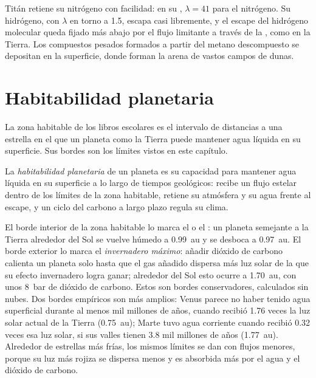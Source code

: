 Titán retiene su nitrógeno con facilidad: en su , $\lambda = 41$ para
el nitrógeno. Su hidrógeno, con $\lambda$ en torno a 1.5, escapa casi libremente, y
el escape del hidrógeno molecular queda fijado más abajo por el flujo limitante
a través de la , como en la Tierra. Los compuestos pesados formados a partir del
metano descompuesto se depositan en la superficie, donde forman la arena de vastos
campos de dunas.

\section{Habitabilidad planetaria}\label{sec:b3:planetary-atmospheres:habitability}

La zona habitable de los libros escolares es el intervalo de distancias a una
estrella en el que un planeta como la Tierra puede mantener agua líquida en su
superficie. Sus bordes son los límites vistos en este capítulo.

\begin{definition}\label{def:b3:planetary-atmospheres:habitability}
La \emph{habitabilidad planetaria} de un
planeta es su capacidad para mantener agua líquida en su superficie a lo largo de
tiempos geológicos: recibe un flujo estelar dentro de los límites de la
zona habitable, retiene su atmósfera y su agua frente al escape, y un
ciclo del carbono a largo plazo regula su clima.
\end{definition}

El borde interior de la zona habitable lo marca el  o el
: un planeta semejante a la Tierra alrededor del Sol se vuelve húmedo a
\qty{0.99}{au} y se desboca a \qty{0.97}{au}. El borde exterior lo marca el
\emph{invernadero máximo}: añadir dióxido de carbono calienta un planeta solo hasta que
el gas añadido dispersa más luz solar de la que su efecto invernadero
logra ganar; alrededor del Sol esto ocurre a
\qty{1.70}{au}, con unos \qty{8}{bar} de dióxido de carbono. Estos son
bordes conservadores, calculados sin nubes. Dos bordes empíricos son más amplios:
Venus parece no haber tenido agua superficial durante al menos mil millones de años,
cuando recibió 1.76 veces la luz solar actual de la Tierra (\qty{0.75}{au});
Marte tuvo agua corriente cuando recibió 0.32 veces esa luz solar, si sus
valles tienen 3.8 mil millones de años (\qty{1.77}{au}). Alrededor de estrellas más frías, los mismos límites se dan
con flujos menores, porque su luz más rojiza se dispersa menos y es absorbida
más por el agua y el dióxido de carbono.

